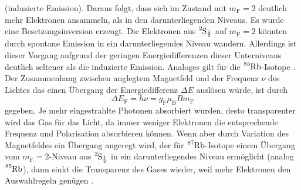 (induzierte Emission). 
Daraus folgt, dass sich im Zustand mit $m_{\text{F}} = 2$ deutlich mehr Elektronen 
ansammeln, als in den darunterliegenden Niveaus. Es wurde eine Besetzungsinversion 
erzeugt. Die Elektronen aus $\ce{^{2}S_{\frac{1}{2}}}$ auf $m_{\text{F}} = 2$ könnten 
durch spontane Emission in ein darunterliegendes Niveau wandern. Allerdings ist dieser 
Vorgang aufgrund der geringen Energiedifferenzen dieser Unterniveaus 
deutlich seltener als die induzierte Emission. 
Analoges gilt für die $\ce{^85Rb}$-Isotope \cite{2}.
Der Zusammenhang zwischen anglegtem Magnetfeld und der Frequenz $\nu$ des Lichtes das
einen Übergang der Energiedifferenz $\Delta E$ auslösen würde, ist durch
\begin{equation}
    \Delta E_{\text{F}} = h \nu = g_{\text{F}} \mu_{\text{B}} B m_{\text{F}}
\end{equation}
gegeben. Je mehr eingestrahlte Photonen absorbiert wurden, desto transparenter wird 
das Gas für das Licht, da immer weniger Elektronen die entsprechende Frequenz und 
Polarisation absorbieren können. Wenn aber durch Variation des Magnetfeldes ein 
Übergang angeregt wird, der für $\ce{^87Rb}$-Isotope einem Übergang vom 
$m_{\text{F}} = 2$-Niveau aus $\ce{^{2}S_{\frac{1}{2}}}$ in ein darunterliegendes 
Niveau ermöglicht (analog $\ce{^85Rb}$), dann sinkt die Transparenz des Gases wieder,
weil mehr Elektronen den Auswahlregeln genügen \cite{1}.
\newpage
